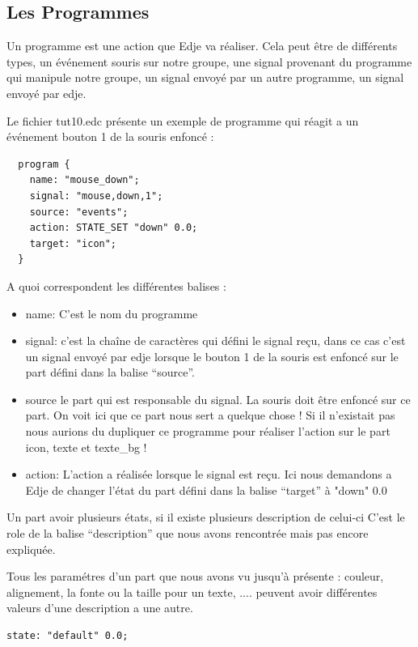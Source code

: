 \documentclass[a4paper]{efr}
\begin{document}
\subsection{Les Programmes}

Un programme est une action que Edje va réaliser. Cela peut être de différents
types, un événement souris sur notre groupe, une signal provenant du programme
qui manipule notre groupe, un signal envoyé par un autre programme, un signal
envoyé par edje.

Le fichier tut10.edc présente un exemple de programme qui réagit a un événement
bouton 1 de la souris enfoncé :

\begin{lstlisting}
  program {
    name: "mouse_down";
    signal: "mouse,down,1";
    source: "events";
    action: STATE_SET "down" 0.0;
    target: "icon";
  }
\end{lstlisting}

A quoi correspondent les différentes balises :

\begin{itemize}
\item name: C'est le nom du programme
\item signal: c'est la chaîne de caractères qui défini le signal reçu, dans ce
cas c'est un signal envoyé par edje lorsque le bouton 1 de la souris est enfoncé
sur le part défini dans la balise ``source''.
\item source le part qui est responsable  du signal. La souris doit être enfoncé sur ce
part. On voit ici que ce part nous sert a quelque chose ! Si il n'existait pas
nous aurions du dupliquer ce programme pour réaliser l'action sur le part icon,
texte et texte\_bg !
\item action: L'action a réalisée lorsque le signal est reçu. Ici nous demandons
a Edje de changer l'état du part défini dans la balise ``target'' à "down" 0.0
\end{itemize}

Un part avoir plusieurs états, si il existe plusieurs description de celui-ci
C'est le role de la balise ``description'' que nous avons rencontrée mais pas
encore expliquée.

Tous les paramétres d'un part que nous avons vu jusqu'à présente : couleur,
alignement, la fonte ou la taille pour un texte, .... peuvent avoir différentes
valeurs d'une description a une autre.

\begin{lstlisting}
state: "default" 0.0;
\end{lstlisting}
\end{document}
